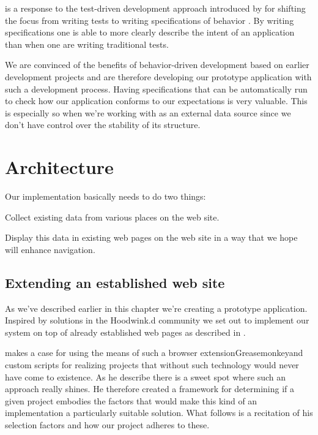  is a response to the test-driven
development approach introduced by \citeauthor{north06} for shifting the focus
from writing tests to writing specifications of behavior
\citep{north06}. By writing specifications one is able to
more clearly describe the intent of an application than when one
are writing traditional tests.

We are convinced of the benefits of behavior-driven development based on
earlier development projects and are therefore developing our
prototype application with such a development process. Having specifications
that can be automatically run to check how our application conforms to our
expectations is very valuable. This is especially so when we're working
with \urort{} as an external data source since we don't have control over
the stability of its structure.

\section{Architecture}
\label{section:implementation.architecture}

Our implementation basically needs to do two things:

\begin{enum}
  \item Collect existing data from various places on the \urort{} web site.
  \item Display this data in existing web pages on the \urort{} web site in
    a way that we hope will enhance navigation.
\end{enum}

\subsection{Extending an established web site}

As we've described earlier in this chapter we're creating a prototype
application. Inspired by solutions in the Hoodwink.d community we set
out to implement our system on top of already established web pages as
described in .

\citet{laird07} makes a case for using the means of such a browser
extension\dash{}Greasemonkey\dash{}and custom scripts for
realizing projects that without such technology would
never have come to existence. As he describe there is a sweet spot where such
an approach really shines. He therefore created a framework for determining
if a given project embodies the factors that would make this kind of an
implementation a particularly suitable solution. What follows is a recitation
of his selection factors and how our project adheres to these.

